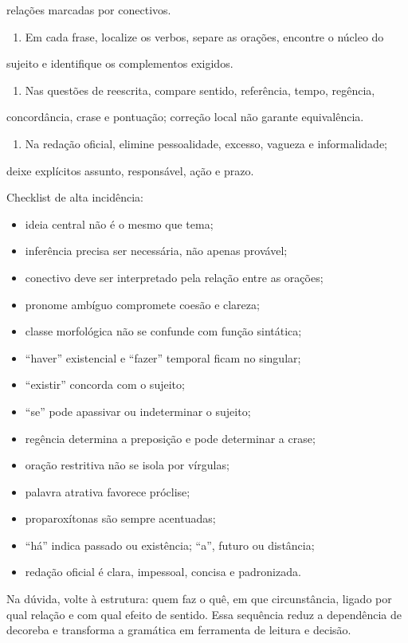 \documentclass[11pt,a4paper]{article}
\begin{document}
   relações marcadas por conectivos.

\begin{enumerate}
  \item Em cada frase, localize os verbos, separe as orações, encontre o núcleo do
\end{enumerate}

   sujeito e identifique os complementos exigidos.

\begin{enumerate}
  \item Nas questões de reescrita, compare sentido, referência, tempo, regência,
\end{enumerate}

   concordância, crase e pontuação; correção local não garante equivalência.

\begin{enumerate}
  \item Na redação oficial, elimine pessoalidade, excesso, vagueza e informalidade;
\end{enumerate}

   deixe explícitos assunto, responsável, ação e prazo.

Checklist de alta incidência:

\begin{itemize}
  \item ideia central não é o mesmo que tema;
  \item inferência precisa ser necessária, não apenas provável;
  \item conectivo deve ser interpretado pela relação entre as orações;
  \item pronome ambíguo compromete coesão e clareza;
  \item classe morfológica não se confunde com função sintática;
  \item “haver” existencial e “fazer” temporal ficam no singular;
  \item “existir” concorda com o sujeito;
  \item “se” pode apassivar ou indeterminar o sujeito;
  \item regência determina a preposição e pode determinar a crase;
  \item oração restritiva não se isola por vírgulas;
  \item palavra atrativa favorece próclise;
  \item proparoxítonas são sempre acentuadas;
  \item “há” indica passado ou existência; “a”, futuro ou distância;
  \item redação oficial é clara, impessoal, concisa e padronizada.
\end{itemize}

Na dúvida, volte à estrutura: quem faz o quê, em que circunstância, ligado por qual relação e com qual efeito de sentido. Essa sequência reduz a dependência de decoreba e transforma a gramática em ferramenta de leitura e decisão.
\end{document}
